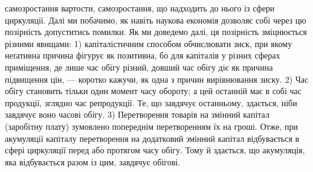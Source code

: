 \parcont{}  %
самозростання вартости, самозростання, що надходить до нього із сфери
циркуляції. Далі ми побачимо, як навіть наукова економія дозволяє собі
через цю позірність допуститись помилки. Як ми доведемо далі, ця позірність
зміцнюється різними явищами: 1) капіталістичним способом обчислювати
зиск, при якому неґативна причина фігурує як позитивна, бо для капіталів
у різних сферах приміщення, де лише час обігу різний, довший час
обігу діє як причина підвищення цін, — коротко кажучи, як одна з причин
вирівнювання зиску. 2) Час обігу становить тільки один момент часу обороту;
а цей останній має в собі час продукції, зглядно час репродукції.
Те, що завдячує останньому, здається, ніби завдячує воно часові обігу.
3) Перетворення товарів на змінний капітал (заробітну плату) зумовлено
попереднім перетворенням їх на гроші. Отже, при акумуляції капіталу
перетворення на додатковий змінний капітал відбувається в сфері циркуляції
перед або протягом часу обігу. Тому й здається, що акумуляція,
яка відбувається разом із цим, завдячує обігові.


